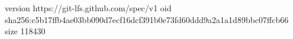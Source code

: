 version https://git-lfs.github.com/spec/v1
oid sha256:c5b17ffb4ae03bb090d7ecf16dcf391b0e73fd60ddd9a2a1a1d89bbc07ffcb66
size 118430
